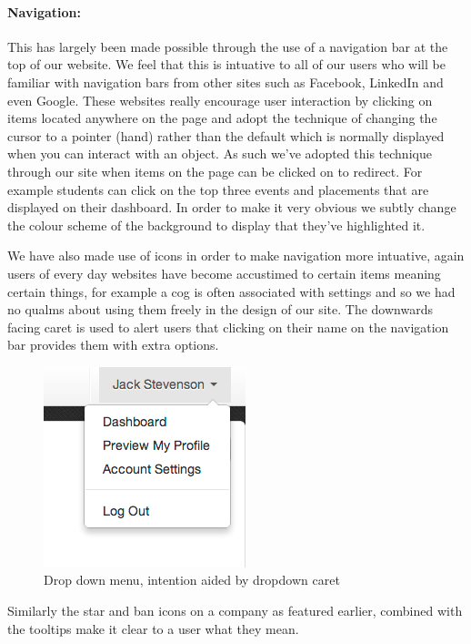     \paragraph{Navigation:} This has largely been made possible through the use of a navigation bar at the top of our website. We feel that this is intuative to all of our users who will be familiar with navigation bars from other sites such as Facebook\cite{facebook}, LinkedIn\cite{linkedin} and even Google\cite{google}. These websites really encourage user interaction by clicking on items located anywhere on the page and adopt the technique of changing the cursor to a pointer (hand) rather than the default which is normally displayed when you can interact with an object. As such we've adopted this technique through our site when items on the page can be clicked on to redirect. For example students can click on the top three events and placements that are displayed on their dashboard. In order to make it very obvious we subtly change the colour scheme of the background to display that they've highlighted it.

    We have also made use of icons in order to make navigation more intuative, again users of every day websites have become accustimed to certain items meaning certain things, for example a cog is often associated with settings and so we had no qualms about using them freely in the design of our site.
    The downwards facing caret is used to alert users that clicking on their name on the navigation bar provides them with extra options.
    
    \begin{figure}[H]\centering
    \includegraphics[scale=0.5]{images/design/navigation_caret}
    \caption{Drop down menu, intention aided by dropdown caret}
    \end{figure}

    Similarly the star and ban icons on a company as featured earlier, combined with the tooltips make it clear to a user what they mean.

